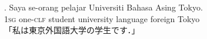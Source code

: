 \documentclass{goken}
\begin{document}
\exg.
Saya se-orang pelajar Universiti Bahasa Asing Tokyo.\\
1\textsc{sg} one-\textsc{clf} student university language foreign Tokyo\\
\glt 「私は東京外国語大学の学生です．」
\label{ex}




\newpage
%
\end{document}
